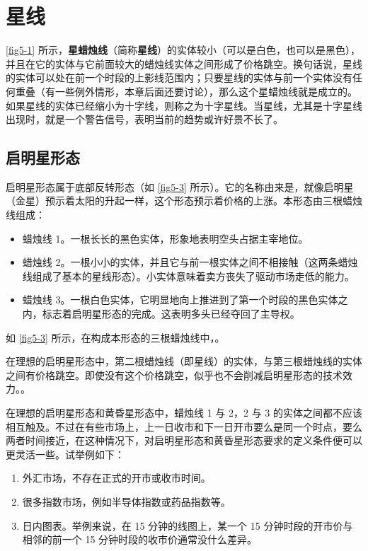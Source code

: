 \chapter{星线}
\autoref{fig5-1} 所示，\textbf{星蜡烛线}（简称\textbf{星线}）的实体较小（可以是白色，也可以是黑色），并且在它的实体与它前面较大的蜡烛线实体之间形成了价格跳空。换句话说，星线的实体可以处在前一个时段的上影线范围内；只要星线的实体与前一个实体没有任何重叠（有一些例外情形，本章后面还要讨论），那么这个星蜡烛线就是成立的。如果星线的实体已经缩小为十字线，则称之为十字星线。当星线，尤其是十字星线出现时，就是一个警告信号，表明当前的趋势或许好景不长了。

\section{启明星形态}
启明星形态属于底部反转形态（如 \autoref{fig5-3} 所示）。它的名称由来是，就像启明星（金星）预示着太阳的升起一样，这个形态预示着价格的上涨。本形态由三根蜡烛线组成：
\begin{itemize}
    \item 蜡烛线 1。一根长长的黑色实体，形象地表明空头占据主宰地位。
    \item 蜡烛线 2。一根小小的实体，并且它与前一根实体之间不相接触（这两条蜡烛线组成了基本的星线形态）。小实体意味着卖方丧失了驱动市场走低的能力。
    \item 蜡烛线 3。一根白色实体，它明显地向上推进到了第一个时段的黑色实体之内，标志着启明星形态的完成。这表明多头已经夺回了主导权。
\end{itemize}


如 \autoref{fig5-3} 所示，在构成本形态的三根蜡烛线中，。

在理想的启明星形态中，第二根蜡烛线（即星线）的实体，与第三根蜡烛线的实体之间有价格跳空。即使没有这个价格跳空，似乎也不会削减启明星形态的技术效力。。

在理想的启明星形态和黄昏星形态中，蜡烛线 1 与 2，2 与 3 的实体之间都不应该相互触及。不过在有些市场上，上一日收市和下一日开市要么是同一个时点，要么两者时间接近，在这种情况下，对启明星形态和黄昏星形态要求的定义条件便可以更灵活一些。试举例如下：
\begin{enumerate}
    \item 外汇市场，不存在正式的开市或收市时间。
    \item 很多指数市场，例如半导体指数或药品指数等。
    \item 日内图表。举例来说，在 15 分钟的线图上，某一个 15 分钟时段的开市价与相邻的前一个 15 分钟时段的收市价通常没什么差异。
\end{enumerate}
